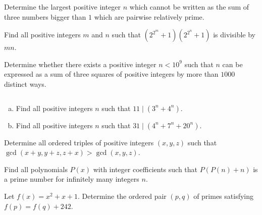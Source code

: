 \documentclass[problems.tex]{subfile}
\begin{document}
	\begin{problem}
		Determine the largest positive integer $n$ which cannot be written as the sum of three numbers bigger than $1$ which are pairwise relatively prime. %
	\end{problem}

	\begin{problem}
		Find all positive integers $m$ and $n$ such that $\left(2^{2^m}+1\right)\left(2^{2^n}+1\right)$ is divisible by $mn$.
	\end{problem}

	\begin{problem}
		Determine whether there exists a positive integer $n<10^9$ such that $n$ can be expressed as a sum of three squares of positive integers by more than $1000$ distinct ways.
	\end{problem}

	\begin{problem}
		$ $
		\begin{enumerate}[(a)]
			\item Find all positive integers $n$ such that $11\mid (3^n + 4^n)$.
			\item Find all positive integers $n$ such that $31\mid (4^n + 7^n + 20^n)$.
		\end{enumerate}
	\end{problem}

	\begin{problem}
		Determine all ordered triples of positive integers $(x, y, z)$ such that $\gcd(x+y, y+z, z+x) > \gcd(x, y, z)$. %
	\end{problem}

	\begin{problem}
		Find all polynomials $P(x)$ with integer coefficients such that $P(P(n) + n)$ is a prime number for infinitely many integers $n$. %
	\end{problem}

	\begin{problem}
		Let $f(x) = x^2 + x + 1$. Determine the ordered pair $(p,q)$ of primes satisfying $f(p) = f(q) + 242$. %
	\end{problem}
\end{document}
